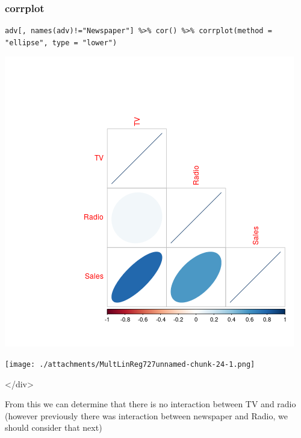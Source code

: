 \documentclass[11pt]{article}
\begin{document}
\subsubsection{corrplot}
\label{sec:orgdcff267}
\begin{verbatim}
adv[, names(adv)!="Newspaper"] %>% cor() %>% corrplot(method = "ellipse", type = "lower")
\end{verbatim}

\begin{center}
\includegraphics[width=.9\linewidth]{CorrelationPlotMultLinReg2.png}
\end{center}

\begin{center}
\texttt{[image: ./attachments/MultLinReg727unnamed-chunk-24-1.png]}
\end{center}

\begin{HTML}
</div>
\end{HTML}

From this we can determine that there is no interaction between TV and
radio (however previously there was interaction between newspaper and
Radio, we should consider that next)
\end{document}
